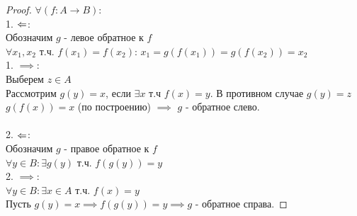 \documentclass[calculus]{subfiles}
\begin{document}
    \begin{proof}
        $\forall (f: A \to B)$:\\
        1.  $\Leftarrow$:\\
        Обозначим $g$ - левое обратное к $f$ \\
        $\forall x_1, x_2$ т.ч. $f(x_1) = f(x_2)$: $x_1 = g(f(x_1)) = g(f(x_2)) = x_2$ \\
        1.  $\implies$:\\
        Выберем $z \in  A$ \\
        Рассмотрим $g(y) = x$, если $\exists x$ т.ч $f(x)=y$. В противном случае $g(y) = z$ \\
        $g(f(x)) = x$ (по построению) $\implies$ $g$ - обратное слево.\\
        \\
        2.  $\Leftarrow$: \\
        Обозначим $g$ - правое обратное к $f$ \\
        $\forall y \in B: \exists g(y)$ т.ч. $f(g(y)) = y$\\
        2.  $\implies$: \\
        $\forall y \in B: \exists x \in A$ т.ч. $f(x) = y$ \\
        Пусть $g(y) = x \implies f(g(y)) = y \implies g$ - обратное справа.
    \end{proof}
\end{document}

